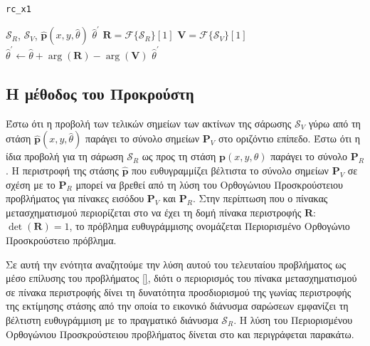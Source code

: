 \begin{algorithm}[!h]
  \caption{\texttt{rc\_x1}}
  \label{alg:algorithm_x1rc}
  \begin{spacing}{1.3}
  \begin{algorithmic}[1]
    \REQUIRE $\mathcal{S}_R$, $\mathcal{S}_V$, $\hat{\bm{p}}(x, y, \hat{\theta})$
    \ENSURE $\hat{\theta}^\prime$
    \STATE $\bm{R} = \mathcal{F}\{\mathcal{S}_R\}[1]$
    \STATE $\bm{V} = \mathcal{F}\{\mathcal{S}_V\}[1]$
    \STATE $\hat{\theta}^\prime \leftarrow \hat{\theta} + \arg(\bm{R}) - \arg(\bm{V})$
    \RETURN $\hat{\theta}^\prime$
  \end{algorithmic}
  \end{spacing}
\end{algorithm}

\subsection{Η μέθοδος του Προκρούστη}
\label{subsection:02_04_02:03}

Έστω ότι η προβολή των τελικών σημείων των ακτίνων της σάρωσης $\mathcal{S}_V$
γύρω από τη στάση $\hat{\bm{p}}(x,y,\hat{\theta})$ παράγει το σύνολο σημείων
$\bm{P}_V$ στο οριζόντιο επίπεδο. Έστω ότι η ίδια προβολή για τη σάρωση
$\mathcal{S}_R$ ως προς τη στάση $\bm{p}(x,y,\theta)$ παράγει το σύνολο
$\bm{P}_R$. Η περιστροφή της στάσης $\hat{\bm{p}}$ που ευθυγραμμίζει βέλτιστα
το σύνολο σημείων $\bm{P}_V$ σε σχέση με το $\bm{P}_R$ μπορεί να βρεθεί από τη
λύση του Ορθογώνιου Προσκρούστειου προβλήματος \cite{Schonemann1966a} για
πίνακες εισόδου $\bm{P}_V$ και $\bm{P}_R$. Στην περίπτωση που ο πίνακας
μετασχηματισμού περιορίζεται στο να έχει τη δομή πίνακα περιστροφής $\bm{R}$:
$\det{(\bm{R})} = 1$, το πρόβλημα ευθυγράμμισης ονομάζεται Περιορισμένο
Ορθογώνιο Προσκρούστειο πρόβλημα.

Σε αυτή την ενότητα αναζητούμε την λύση αυτού του τελευταίου προβλήματος ως
μέσο επίλυσης του προβλήματος \ref{}, διότι ο περιορισμός του πίνακα
μετασχηματισμού σε πίνακα περιστροφής δίνει τη δυνατότητα προσδιορισμού της
γωνίας περιστροφής της εκτίμησης στάσης από την οποία το εικονικό διάνυσμα
σαρώσεων εμφανίζει τη βέλτιστη ευθυγράμμιση με το πραγματικό διάνυσμα
$\mathcal{S}_R$. Η λύση του Περιορισμένου Ορθογώνιου Προσκρούστειου προβλήματος
δίνεται στο \cite{Umeyama1991} και περιγράφεται παρακάτω.

